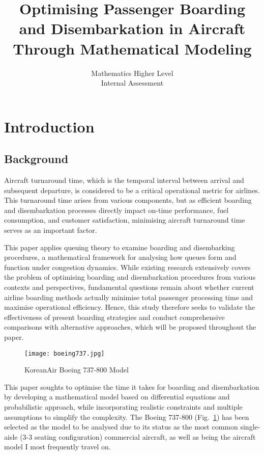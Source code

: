 \documentclass[12pt,a4paper]{article}
\title{Optimising Passenger Boarding and Disembarkation in Aircraft Through Mathematical Modeling}
\author{Mathematics Higher Level \\
Internal Assessment}
\date{}
\begin{document}
\maketitle

\section{Introduction}
\subsection{Background}

Aircraft turnaround time, which is the temporal interval between arrival and subsequent departure, is considered to be a critical operational metric for airlines. This turnaround time arises from various components, but as efficient boarding and disembarkation processes directly impact on-time performance, fuel consumption, and customer satisfaction, minimising aircraft turnaround time serves as an important factor.

This paper applies queuing theory to examine boarding and disembarking procedures, a mathematical framework for analysing how queues form and function under congestion dynamics. While existing research extensively covers the problem of optimising boarding and disembarkation procedures from various contexts and perspectives, fundamental questions remain about whether current airline boarding methods actually minimise total passenger processing time and maximise operational efficiency. Hence, this study therefore seeks to validate the effectiveness of present boarding strategies and conduct comprehensive comparisons with alternative approaches, which will be proposed throughout the paper.

\begin{figure}[H]
\centering
\texttt{[image: boeing737.jpg]}
\caption{KoreanAir Boeing 737-800 Model}
\label{fig:boeing737}
\end{figure}

This paper soughts to optimise the time it takes for boarding and disembarkation by developing a mathematical model based on differential equations and probabilistic approach, while incorporating realistic constraints and multiple assumptions to simplify the complexity. The Boeing 737-800 (Fig.~\ref{fig:boeing737}) has been selected as the model to be analysed due to its status as the most common single-aisle (3-3 seating configuration) commercial aircraft, as well as being the aircraft model I most frequently travel on.
\end{document}
